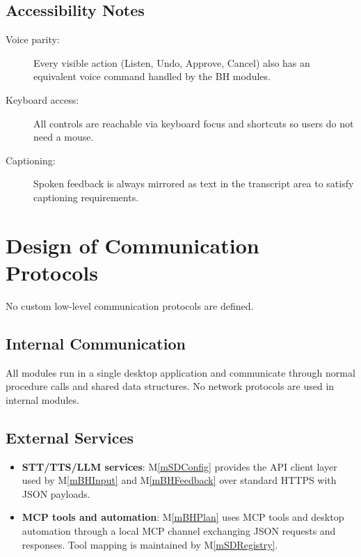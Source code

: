 \documentclass[12pt, titlepage]{article}
\newcommand{\mref}[1]{M\ref{#1}}
\begin{document}
\subsection{Accessibility Notes}

\begin{description}
  \item[Voice parity:] Every visible action (Listen, Undo, Approve, Cancel) also
  has an equivalent voice command handled by the BH modules.
  \item[Keyboard access:] All controls are reachable via keyboard focus and
  shortcuts so users do not need a mouse.
  \item[Captioning:] Spoken feedback is always mirrored as text in the transcript
  area to satisfy captioning requirements.
\end{description}

\section{Design of Communication Protocols}
\label{SecComm}

\noindent No custom low-level communication protocols are defined.

\subsection{Internal Communication}

All modules run in a single desktop application and communicate through normal
procedure calls and shared data structures. No network protocols are used in
internal modules.

\subsection{External Services}

\begin{itemize}
  \item \textbf{STT/TTS/LLM services}: \mref{mSDConfig} provides the API client
  layer used by \mref{mBHInput} and \mref{mBHFeedback} over standard HTTPS with
  JSON payloads.

  \item \textbf{MCP tools and automation}: \mref{mBHPlan} uses MCP tools and
  desktop automation through a local MCP channel exchanging JSON requests and
  responses. Tool mapping is maintained by \mref{mSDRegistry}.
\end{itemize}
\end{document}
